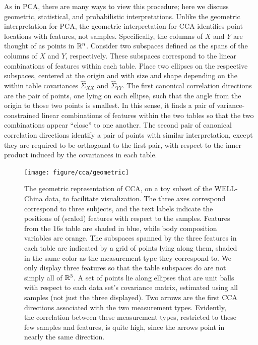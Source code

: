 \documentclass{article}
\begin{document}
As in PCA, there are many ways to view this procedure; here we discuss
geometric, statistical, and probabilistic interpretations. Unlike the geometric
interpretation for PCA, the geometric interpretation for CCA identifies point
locations with features, not samples. Specifically, the columns of $X$ and $Y$
are thought of as points in $\mathbb{R}^{n}$. Consider two subspaces defined as the
spans of the columns of $X$ and $Y$, respectively. These subspaces correspond to
the linear combinations of features within each table. Place two ellipses on the
respective subspaces, centered at the origin and with size and shape depending
on the within table covariances $\hat{\Sigma}_{XX}$ and $\hat{\Sigma}_{YY}$. The
first canonical correlation directions are the pair of points, one lying on each
ellipse, such that the angle from the origin to those two points is smallest. In
this sense, it finds a pair of variance-constrained linear combinations of
features within the two tables so that the two combinations appear ``close'' to
one another. The second pair of canonical correlation directions identify a pair
of points with similar interpretation, except they are required to be orthogonal
to the first pair, with respect to the inner product induced by the covariances
in each table.

\begin{figure}[ht]
  \centering
  \texttt{[image: figure/cca/geometric]}
  \caption{The geometric representation of CCA, on a toy subset of the WELL-China
    data, to facilitate visualization. The three axes correspond correspond to
    three subjects, and the text labels indicate the positions of (scaled) features with
    respect to the samples. Features from the 16s table are shaded in blue,
    while body composition variables are orange. The subspaces spanned by the
    three features in each table are indicated by a grid of points lying along
    them, shaded in the same color as the measurement type they correspond to.
    We only display three features so that the table subspaces do are not simply
    all of $\mathbb{R}^{3}$. A set of points lie along ellipses that are unit balls
    with respect to each data set's covariance matrix, estimated using all
    samples (not just the three displayed). Two arrows are the first CCA
    directions associated with the two measurement types. Evidently, the
    correlation between these measurement types, restricted to these few samples
    and features, is quite high, since the arrows point in nearly the same
    direction.
    \label{fig:cca_geometric} }
\end{figure}
\end{document}
